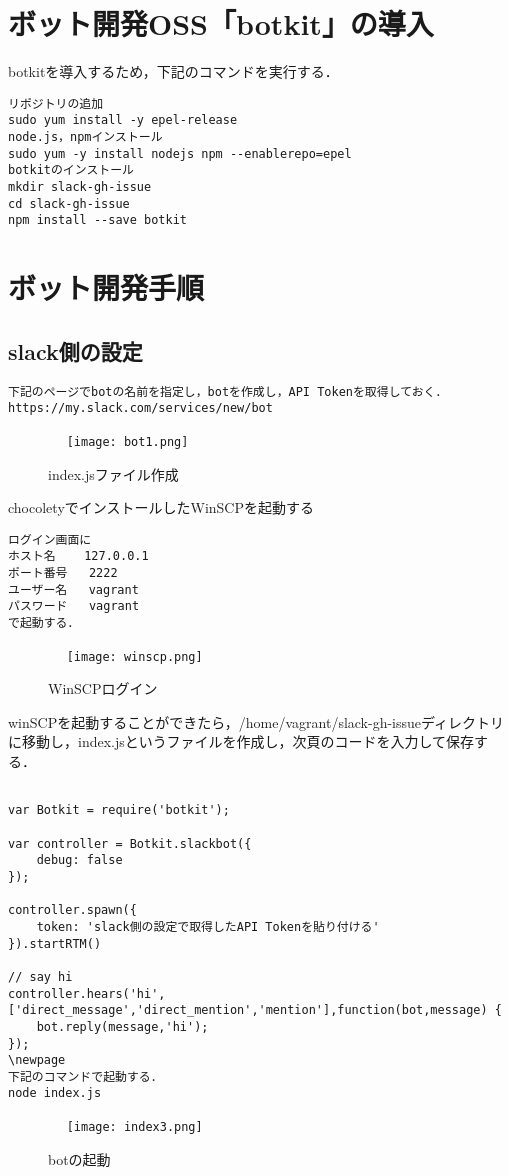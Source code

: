 \section{ボット開発OSS「botkit」の導入}
botkitを導入するため，下記のコマンドを実行する．
\begin{verbatim}
リポジトリの追加
sudo yum install -y epel-release
node.js，npmインストール
sudo yum -y install nodejs npm --enablerepo=epel
botkitのインストール
mkdir slack-gh-issue
cd slack-gh-issue
npm install --save botkit
\end{verbatim}

\section{ボット開発手順}
\subsection{slack側の設定}
\begin{verbatim}
下記のページでbotの名前を指定し，botを作成し，API Tokenを取得しておく．
https://my.slack.com/services/new/bot
\end{verbatim}

\begin{figure}[htb]
\centering　
\texttt{[image: bot1.png]}
\caption{index.jsファイル作成}\label{tab:winscp}
\end{figure}

\newpage

chocoletyでインストールしたWinSCPを起動する
\begin{verbatim}
ログイン画面に
ホスト名	127.0.0.1
ポート番号	2222
ユーザー名	vagrant
パスワード	vagrant
で起動する．
\end{verbatim}
\begin{figure}[htb]
\centering　
\texttt{[image: winscp.png]}
\caption{WinSCPログイン}\label{tab:winscp}
\end{figure}


winSCPを起動することができたら，/home/vagrant/slack-gh-issueディレクトリに移動し，index.jsというファイルを作成し，次頁のコードを入力して保存する．
\newpage

\begin{verbatim}

var Botkit = require('botkit');

var controller = Botkit.slackbot({
    debug: false
});

controller.spawn({
    token: 'slack側の設定で取得したAPI Tokenを貼り付ける'
}).startRTM()

// say hi
controller.hears('hi',['direct_message','direct_mention','mention'],function(bot,message) {
    bot.reply(message,'hi');
});
\newpage
下記のコマンドで起動する．
node index.js

\end{verbatim}
\begin{figure}[htb]
\centering　
\texttt{[image: index3.png]}
\caption{botの起動}\label{tab:botの起動}
\end{figure}


